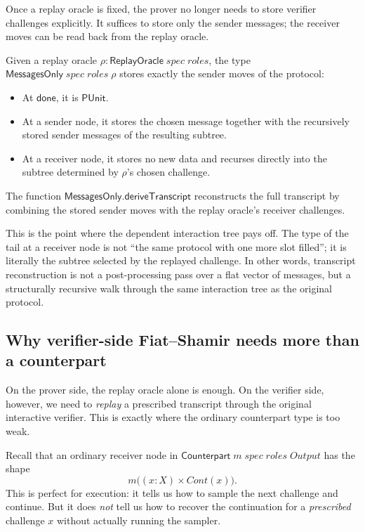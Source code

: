 Once a replay oracle is fixed, the prover no longer needs to store verifier
challenges explicitly.  It suffices to store only the sender messages; the
receiver moves can be read back from the replay oracle.

\begin{definition}
  \label{int:messages-only}
  Given a replay oracle $\rho : \mathsf{ReplayOracle}\;\mathit{spec}\;
  \mathit{roles}$, the type
  $\mathsf{MessagesOnly}\;\mathit{spec}\;\mathit{roles}\;\rho$ stores exactly
  the sender moves of the protocol:
  \begin{itemize}
    \item At $\mathsf{done}$, it is $\mathsf{PUnit}$.
    \item At a sender node, it stores the chosen message together with the
      recursively stored sender messages of the resulting subtree.
    \item At a receiver node, it stores no new data and recurses directly into
      the subtree determined by $\rho$'s chosen challenge.
  \end{itemize}
  The function
  $\mathsf{MessagesOnly.deriveTranscript}$ reconstructs the full transcript by
  combining the stored sender moves with the replay oracle's receiver
  challenges.
\end{definition}

This is the point where the dependent interaction tree pays off.  The type of
the tail at a receiver node is not ``the same protocol with one more slot
filled''; it is literally the subtree selected by the replayed challenge.  In
other words, transcript reconstruction is not a post-processing pass over a
flat vector of messages, but a structurally recursive walk through the same
interaction tree as the original protocol.

\subsection{Why verifier-side Fiat--Shamir needs more than a counterpart}

On the prover side, the replay oracle alone is enough.  On the verifier side,
however, we need to \emph{replay} a prescribed transcript through the original
interactive verifier.  This is exactly where the ordinary counterpart type is
too weak.

Recall that an ordinary receiver node in
$\mathsf{Counterpart}\;m\;\mathit{spec}\;\mathit{roles}\;\mathit{Output}$ has
the shape
\[
  m\bigl((x : X) \times \mathit{Cont}(x)\bigr).
\]
This is perfect for execution: it tells us how to sample the next challenge and
continue.  But it does \emph{not} tell us how to recover the continuation for a
\emph{prescribed} challenge $x$ without actually running the sampler.

